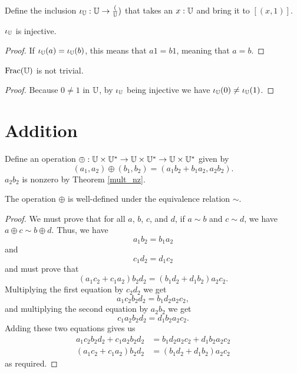 \documentclass[../../math.tex]{subfiles}
\begin{document}
\begin{definition}
    Define the inclusion $\iota_{\mathbb{U}} : \mathbb{U} \to \frac({\mathbb{U}})$ that takes an $x : \mathbb{U}$
    and bring it to $[(x, 1)]$.
\end{definition}

\begin{instance}
    $\iota_{\mathbb{U}}$ is injective.
\end{instance}
\begin{proof}
    If $\iota_{\mathbb{U}}(a) = \iota_{\mathbb{U}}(b)$, this means that $a1 = b1$, meaning that $a =
    b$.
\end{proof}

\begin{instance}
    $\operatorname{Frac}(\mathbb{U})$ is not trivial.
\end{instance}
\begin{proof}
    Because $0 \neq 1$ in $\mathbb{U}$, by $\iota_{\mathbb{U}}$ being injective we have
    $\iota_{\mathbb{U}}(0) \neq \iota_{\mathbb{U}}(1)$.
\end{proof}

\section{Addition}

\begin{definition}
    Define an operation $\oplus : \mathbb{U} \times \mathbb{U}^* \to \mathbb{U} \times \mathbb{U}^* \to \mathbb{U}
    \times \mathbb{U}^*$ given by
    \[
        (a_1, a_2) \oplus (b_1, b_2) = (a_1b_2 + b_1a_2, a_2b_2).
    \]
    $a_2b_2$ is nonzero by Theorem \ref{mult_nz}.
\end{definition}

\begin{lemma}
    The operation $\oplus$ is well-defined under the equivalence relation
    $\sim$.
\end{lemma}
\begin{proof}
    We must prove that for all $a$, $b$, $c$, and $d$, if $a \sim b$ and $c \sim
    d$, we have $a \oplus c \sim b \oplus d$.  Thus, we have
    \[
        a_1b_2 = b_1a_2
    \]
    and
    \[
        c_1d_2 = d_1c_2
    \]
    and must prove that
    \[
        (a_1c_2 + c_1a_2)b_2d_2 = (b_1d_2 + d_1b_2)a_2c_2.
    \]
    Multiplying the first equation by $c_2d_2$ we get
    \[
        a_1c_2b_2d_2 = b_1d_2a_2c_2,
    \]
    and multiplying the second equation by $a_2b_2$ we get
    \[
        c_1a_2b_2d_2 = d_1b_2a_2c_2.
    \]
    Adding these two equations gives us
    \begin{align*}
        a_1c_2b_2d_2 + c_1a_2b_2d_2 &= b_1d_2a_2c_2 + d_1b_2a_2c_2 \\
        (a_1c_2 + c_1a_2)b_2d_2 &= (b_1d_2 + d_1b_2)a_2c_2
    \end{align*}
    as required.
\end{proof}
\end{document}

